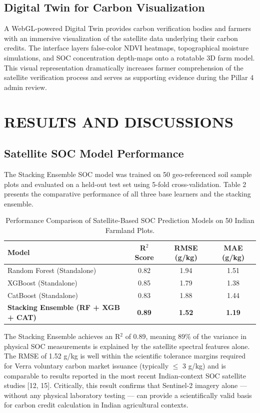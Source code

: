 \documentclass[10pt,a4paper]{article}
\begin{document}
\subsection{Digital Twin for Carbon Visualization}
A WebGL-powered Digital Twin provides carbon verification bodies and farmers with an immersive visualization of the satellite data underlying their carbon credits. The interface layers false-color NDVI heatmaps, topographical moisture simulations, and SOC concentration depth-maps onto a rotatable 3D farm model. This visual representation dramatically increases farmer comprehension of the satellite verification process and serves as supporting evidence during the Pillar 4 admin review.

\section{RESULTS AND DISCUSSIONS}

\subsection{Satellite SOC Model Performance}
The Stacking Ensemble SOC model was trained on 50 geo-referenced soil sample plots and evaluated on a held-out test set using 5-fold cross-validation. Table 2 presents the comparative performance of all three base learners and the stacking ensemble.

\begin{table}[H]
\centering
\caption{Performance Comparison of Satellite-Based SOC Prediction Models on 50 Indian Farmland Plots.}
\begin{tabular}{|l|c|c|c|}
\hline
\textbf{Model} & \textbf{R$^2$ Score} & \textbf{RMSE (g/kg)} & \textbf{MAE (g/kg)} \\
\hline
Random Forest (Standalone) & 0.82 & 1.94 & 1.51 \\
XGBoost (Standalone) & 0.85 & 1.79 & 1.38 \\
CatBoost (Standalone) & 0.83 & 1.88 & 1.44 \\
\textbf{Stacking Ensemble (RF + XGB + CAT)} & \textbf{0.89} & \textbf{1.52} & \textbf{1.19} \\
\hline
\end{tabular}
\end{table}

The Stacking Ensemble achieves an R$^2$ of 0.89, meaning 89\% of the variance in physical SOC measurements is explained by the satellite spectral features alone. The RMSE of 1.52 g/kg is well within the scientific tolerance margins required for Verra voluntary carbon market issuance (typically $\leq$ 3 g/kg) and is comparable to results reported in the most recent Indian-context SOC satellite studies [12, 15]. Critically, this result confirms that Sentinel-2 imagery alone — without any physical laboratory testing — can provide a scientifically valid basis for carbon credit calculation in Indian agricultural contexts.
\end{document}
